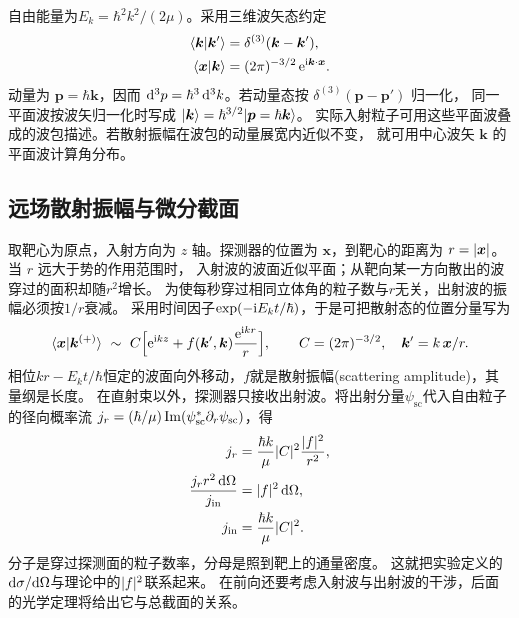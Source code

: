自由能量为$E_k = \hbar^2k^2/(2\mu)$。采用三维波矢态约定
\begin{subequations}
    \begin{align}
        \langle\bm k\vert\bm k'\rangle &= \delta^{(3)}(\bm k - \bm k'),\\
        \langle\bm x\vert\bm k\rangle &= (2\pi)^{-3/2}\mathop{}\!\mathrm{e}^{\mathrm{i}\bm k\cdot\bm x}.
    \end{align}
\end{subequations}
动量为 $\bm p = \hbar\bm k$，因而 $\mathop{}\!\mathrm{d}^3p = \hbar^3\mathop{}\!\mathrm{d}^3k$。若动量态按 $\delta^{(3)}(\bm p - \bm p')$ 归一化，
同一平面波按波矢归一化时写成 $\lvert\bm k\rangle = \hbar^{3/2}\lvert\bm p = \hbar\bm k\rangle$。
实际入射粒子可用这些平面波叠成的波包描述。若散射振幅在波包的动量展宽内近似不变，
就可用中心波矢 $\bm k$ 的平面波计算角分布。

\subsection{远场散射振幅与微分截面}
取靶心为原点，入射方向为 $z$ 轴。探测器的位置为 $\bm x$，到靶心的距离为 $r = \lvert\bm x\rvert$。当 $r$ 远大于势的作用范围时，
入射波的波面近似平面；从靶向某一方向散出的波穿过的面积却随$r^2$增长。
为使每秒穿过相同立体角的粒子数与$r$无关，出射波的振幅必须按$1/r$衰减。
采用时间因子$\exp(-\mathrm{i} E_k t/\hbar)$，于是可把散射态的位置分量写为
\begin{equation}
    \langle\bm x\vert\bm k^{(+)}\rangle\  \sim \
    C\Bigl[\mathop{}\!\mathrm{e}^{\mathrm{i} kz} + f(\bm k',\bm k)\frac{\mathop{}\!\mathrm{e}^{\mathrm{i} kr}}{r}\Bigr],
    \qquad C = (2\pi)^{-3/2},\quad \bm k' = k\,\bm x/r .
    \label{eq:outgoing-wave-pattern}
\end{equation}
相位$kr - E_kt/\hbar$恒定的波面向外移动，$f$就是散射振幅(scattering amplitude)，其量纲是长度。
在直射束以外，探测器只接收出射波。将出射分量$\psi_{\mathrm{sc}}$代入自由粒子的径向概率流
$j_r = (\hbar/\mu)\operatorname{Im}(\psi_{\mathrm{sc}}^\ast\partial_r\psi_{\mathrm{sc}})$，得
\begin{subequations}
    \begin{align}
        j_r &= \frac{\hbar k}{\mu}\lvert C\rvert^2\frac{\lvert f\rvert^2}{r^2},\\
        \frac{j_r r^2\mathop{}\!\mathrm{d}\Omega}{j_{\mathrm{in}}} &= \lvert f\rvert^2\mathop{}\!\mathrm{d}\Omega,\\
        j_{\mathrm{in}} &= \frac{\hbar k}{\mu}\lvert C\rvert^2 .
    \end{align}
\end{subequations}
分子是穿过探测面的粒子数率，分母是照到靶上的通量密度。
这就把实验定义的$\mathop{}\!\mathrm{d}\sigma/\mathrm{d}\Omega$与理论中的$\lvert f\rvert^2$联系起来。
在前向还要考虑入射波与出射波的干涉，后面的光学定理将给出它与总截面的关系。

